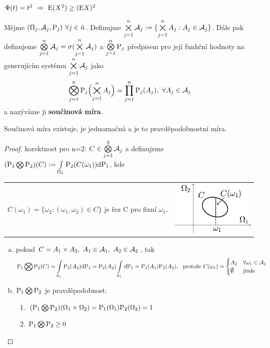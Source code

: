 \begin{dusl}
	$\Phi(t)=t^2~\Rightarrow~ \mathrm{E} (X^2)\geq (\mathrm{E} X)^2$
\end{dusl}
\begin{define}
	Mějme $(\Omega_j,\mathcal{A}_j,\mathrm{P}_j)~\forall j\in\hat{n}$. Definujme $\bigtimes\limits_{j=1}^n \mathcal{A}_j:=\{ \bigtimes\limits_{j=1}^n A_j:A_j\in\mathcal{A}_j \}$. Dále pak definujeme $\bigotimes\limits_{j=1}^n \mathcal{A}_j=\sigma(\bigtimes\limits_{j=1}^n \mathcal{A}_j)$ a $\bigotimes\limits_{j=1}^n \mathrm{P}_j$ předpisem pro její funkční hodnoty na generujícím systému $\bigtimes\limits_{j=1}^n \mathcal{A}_j$ jako 
	$$ \bigotimes\limits_{j=1}^n \mathrm{P}_j\Bigl(\bigtimes\limits_{j=1}^n A_j\Bigr)=\prod\limits_{j=1}^n \mathrm{P}_j(A_j),~\forall A_j\in\mathcal{A}_j $$ a nazýváme ji \textbf{součinová míra}.
\end{define}
\begin{theorem}
	Součinová míra existuje, je jednoznačná a je to pravděpodobnostní míra.
\begin{proof}
	korektnost pro n=2: $ C\in\bigotimes\limits_{j=1}^2 \mathcal{A}_j $ a definujeme $(\mathrm{P}_1\bigotimes \mathrm{P}_2)(C):=\int\limits_{\Omega_1}\mathrm{P}_2(C(\omega_1))\mathrm{d} \mathrm{P}_1$, kde 	\begin{tabular}{p{10cm} m{6cm}}
	$C(\omega_1)=\{ \omega_2:(\omega_1,\omega_2)\in C \}$ je řez C pro fixní $\omega_1$. & \includegraphics[width=4cm]{C}
	\end{tabular} 
	\begin{enumerate}[a)]
		\item pokud $C=A_1\times A_2,~A_1\in\mathcal{A}_1,~A_2\in\mathcal{A}_2$, tak
		\[
		\PP_1\bigotimes \PP_2(C)= \int\limits_{A_1}\PP_2(A_2)\dif \PP_1=\PP_2(A_2)\int\limits_{A_1}\dif \PP_1=\PP_1(A_1)\PP_2(A_2),~\text{ protože }C(\omega_1)=\begin{cases}
		A_2 & \forall \omega_1\in\Aa_1 \\ \emptyset & \text{jinde}
		\end{cases}
		\]
		\item $\mathrm{P}_1 \bigotimes \mathrm{P}_2$ je pravděpodobnost:\begin{enumerate}[1)]
			\item $(\mathrm{P}_1\bigotimes \mathrm{P}_2)(\Omega_1 \times \Omega_2)=\mathrm{P}_1(\Omega_1)\mathrm{P}_2(\Omega_2)=1$
			\item $\mathrm{P}_1\bigotimes \mathrm{P}_2 \geq 0$

\end{enumerate}
\end{enumerate}
\end{proof}
\end{theorem}
